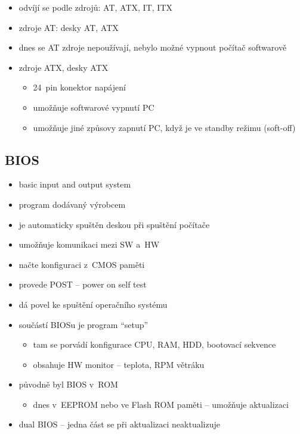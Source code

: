 \documentclass[a4paper,12pt]{article}
\providecommand{\tightlist}{%
\setlength{\itemsep}{0pt}\setlength{\parskip}{0pt}}
\begin{document}
\begin{itemize}
  \tightlist
  \item odvíjí se podle zdrojů: AT, ATX, IT, ITX
  \item zdroje AT: desky AT, ATX
  \item dnes se AT zdroje nepoužívají, nebylo možné vypnout počítač softwarově
  \item zdroje ATX, desky ATX
  \begin{itemize}
    \tightlist
    \item 24~pin konektor napájení
    \item umožňuje softwarové vypnutí PC
    \item umožňuje jiné způsovy zapnutí PC, když je ve standby režimu (soft-off)
  \end{itemize}
\end{itemize}

\subsection{BIOS}

\begin{itemize}
  \tightlist
  \item basic input and output system
  \item program dodávaný výrobcem
  \item je automaticky spuštěn deskou při spuštění počítače
  \item umožňuje komunikaci mezi SW a~HW
  \item načte konfiguraci z~CMOS paměti
  \item provede POST -- power on self test
  \item dá povel ke spuštění operačního systému
  \item součástí BIOSu je program ``setup''
  \begin{itemize}
    \tightlist
    \item tam se porvádí konfigurace CPU, RAM, HDD, bootovací sekvence
    \item obsahuje HW monitor -- teplota, RPM větráku
  \end{itemize}
  \item původně byl BIOS v~ROM
  \begin{itemize}
    \tightlist
    \item dnes v~EEPROM nebo ve Flash ROM paměti -- umožňuje aktualizaci
  \end{itemize}
  \item dual BIOS -- jedna část se při aktualizaci neaktualizuje
\end{itemize}
\end{document}
